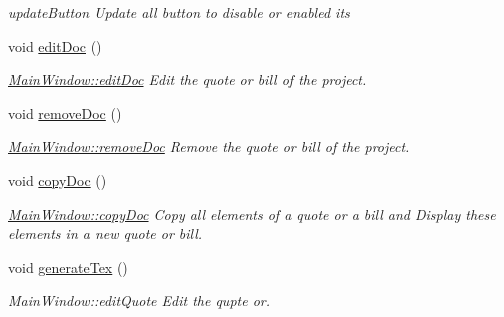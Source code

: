 \begin{DoxyCompactItemize}
\begin{DoxyCompactList}\small\item\em update\-Button Update all button to disable or enabled its \end{DoxyCompactList}\item 
\hypertarget{classGui_1_1MainWindow_a06bc679c41574cb679c6e5e7b673139c}{void \hyperlink{classGui_1_1MainWindow_a06bc679c41574cb679c6e5e7b673139c}{edit\-Doc} ()}\label{classGui_1_1MainWindow_a06bc679c41574cb679c6e5e7b673139c}

\begin{DoxyCompactList}\small\item\em \hyperlink{classGui_1_1MainWindow_a06bc679c41574cb679c6e5e7b673139c}{Main\-Window\-::edit\-Doc} Edit the quote or bill of the project. \end{DoxyCompactList}\item 
\hypertarget{classGui_1_1MainWindow_af86458ad953cb70fb7a88245a6047550}{void \hyperlink{classGui_1_1MainWindow_af86458ad953cb70fb7a88245a6047550}{remove\-Doc} ()}\label{classGui_1_1MainWindow_af86458ad953cb70fb7a88245a6047550}

\begin{DoxyCompactList}\small\item\em \hyperlink{classGui_1_1MainWindow_af86458ad953cb70fb7a88245a6047550}{Main\-Window\-::remove\-Doc} Remove the quote or bill of the project. \end{DoxyCompactList}\item 
\hypertarget{classGui_1_1MainWindow_adf1e721c73626d1810dd90c84920dcde}{void \hyperlink{classGui_1_1MainWindow_adf1e721c73626d1810dd90c84920dcde}{copy\-Doc} ()}\label{classGui_1_1MainWindow_adf1e721c73626d1810dd90c84920dcde}

\begin{DoxyCompactList}\small\item\em \hyperlink{classGui_1_1MainWindow_adf1e721c73626d1810dd90c84920dcde}{Main\-Window\-::copy\-Doc} Copy all elements of a quote or a bill and Display these elements in a new quote or bill. \end{DoxyCompactList}\item 
\hypertarget{classGui_1_1MainWindow_a0aaba9436d6649908c54bbe7382d5780}{void \hyperlink{classGui_1_1MainWindow_a0aaba9436d6649908c54bbe7382d5780}{generate\-Tex} ()}\label{classGui_1_1MainWindow_a0aaba9436d6649908c54bbe7382d5780}

\begin{DoxyCompactList}\small\item\em Main\-Window\-::edit\-Quote Edit the qupte or. \end{DoxyCompactList}\end{DoxyCompactItemize}
